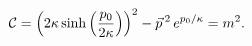 \begin{equation}\label{4}
{\cal C}  = \left(2\kappa \sinh \left(\frac{p_0}{2\kappa}\right)\right)^2 -
\vec{p}\,{}^2\, e^{p_0/\kappa}=m^2.
\end{equation}

